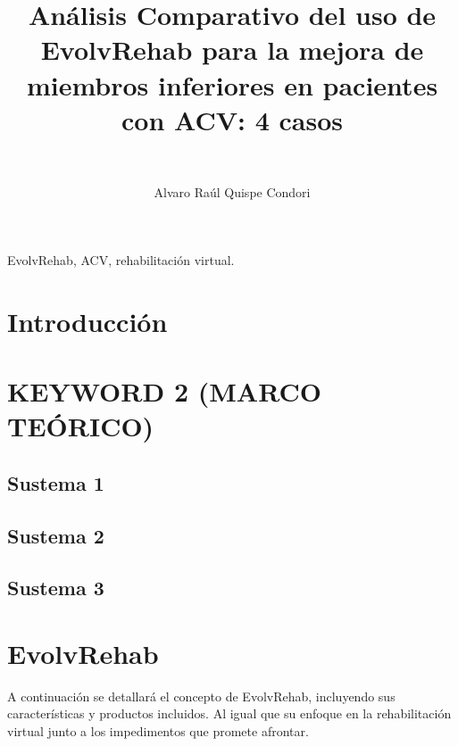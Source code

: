 \documentclass[journal]{IEEEtran}
\begin{document}
\title{Análisis Comparativo del uso de EvolvRehab para la mejora de miembros inferiores en pacientes con ACV: 4 casos}

\author{%
\\
}
\author{Alvaro Raúl Quispe Condori\\
}


\maketitle

\begin{abstract}
   
   
   
   
\end{abstract}

\begin{IEEEkeywords}
    EvolvRehab, ACV, rehabilitación virtual.
\end{IEEEkeywords}


\section{Introducción}
\section{KEYWORD 2 (MARCO TEÓRICO)}
\subsection{Sustema 1}
\subsection{Sustema 2}
\subsection{Sustema 3}

\section{EvolvRehab}
A continuación se detallará el concepto de EvolvRehab, incluyendo sus características y productos incluidos. Al igual que su enfoque en la rehabilitación virtual junto a los impedimentos que promete afrontar. 
\end{document}

